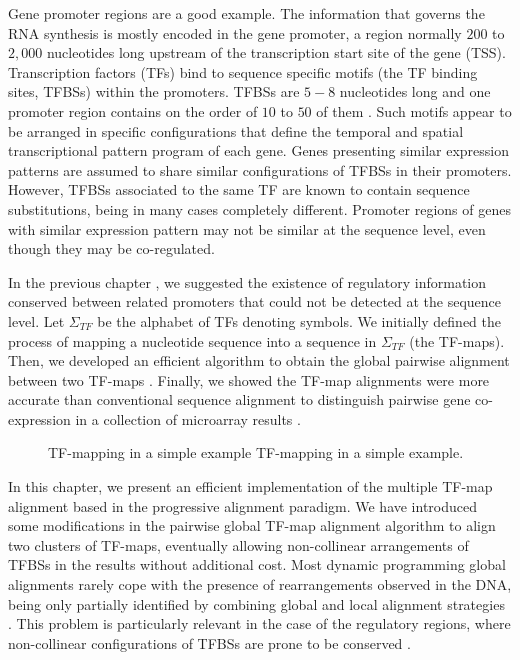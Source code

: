 Gene promoter regions are a good example. The information that governs the
RNA synthesis is mostly encoded in the gene promoter, a region normally $200$
to $2,000$ nucleotides long upstream of the transcription start site of the gene (TSS).
Transcription factors (TFs) bind to sequence specific motifs (the TF binding
sites, TFBSs) within the promoters. TFBSs are $5-8$ nucleotides long and one
promoter region contains on the order of $10$ to $50$ of them \citep{wray:2003a}.
Such motifs appear to be arranged in specific configurations that define the
temporal and spatial transcriptional pattern program of each gene. Genes
presenting similar expression patterns are assumed to share similar
configurations of TFBSs in their promoters. However, TFBSs associated to
the same TF are known to contain sequence substitutions, being in many
cases completely different. Promoter regions of genes with similar
expression pattern may not be similar at the sequence level, even though
they may be co-regulated.

In the previous chapter \citep{blanco:2006b}, we suggested the existence of 
regulatory information conserved between related promoters that could not be 
detected at the sequence level. Let $\Sigma_{TF}$ be the alphabet of TFs denoting
symbols. We initially defined the process of mapping a nucleotide sequence into a 
sequence in $\Sigma_{TF}$ (the TF-maps). Then, we developed an efficient algorithm 
to obtain the global pairwise alignment between two TF-maps \citep{blanco:2006b}. 
Finally, we showed the TF-map alignments were more accurate than conventional sequence 
alignment to distinguish pairwise gene co-expression in a collection of microarray 
results \citep{blanco:2006b}.

\begin{figure}[t!]
\begin{center}
\setlength{\fboxsep}{0pt}
          {TF-mapping in a simple example}%
          {TF-mapping in a simple example.}%
          {}
\end{center}
\end{figure}

In this chapter, we present an efficient implementation of
the multiple TF-map alignment based in the progressive alignment paradigm.
We have introduced some modifications in the pairwise global TF-map alignment
algorithm to align two clusters of TF-maps, eventually allowing non-collinear
arrangements of TFBSs in the results without additional cost. Most dynamic
programming global alignments rarely cope with the presence of rearrangements
observed in the DNA, being only partially identified by combining global and
local alignment strategies \citep{brudno:2004a,darling:2004a}. This problem is
particularly relevant in the case of the regulatory regions, where
non-collinear configurations of TFBSs are prone to be conserved
\citep{nix:2005a}. 

